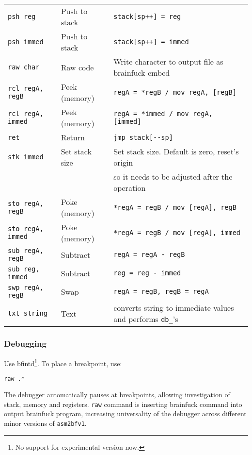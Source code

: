 \documentclass{article}
\begin{document}
\begin{table}[h]
\begin{longtable}{lll}
\verb|psh reg| & Push to stack & \verb|stack[sp++] = reg|     \\
\verb|psh immed| & Push to stack & \verb|stack[sp++] = immed|     \\
\verb|raw char| & Raw code & Write character to output file as brainfuck embed     \\
\verb|rcl regA, regB| & Peek (memory) & \verb|regA = *regB / mov regA, [regB]|      \\
\verb|rcl regA, immed| & Peek (memory) & \verb|regA = *immed / mov regA, [immed]|      \\
\verb|ret| & Return & \verb|jmp stack[--sp]|     \\
\verb|stk immed| & Set stack size & Set stack size. Default is zero, reset's origin       \\
 & & so it needs to be adjusted after the operation \\
\verb|sto regA, regB| & Poke (memory) & \verb|*regA = regB / mov [regA], regB|      \\
\verb|sto regA, immed| & Poke (memory) & \verb|*regA = regB / mov [regA], immed|      \\
\verb|sub regA, regB| & Subtract & \verb|regA = regA - regB|      \\
\verb|sub reg, immed| & Subtract & \verb|reg = reg - immed|      \\
\verb|swp regA, regB| & Swap & \verb|regA = regB, regB = regA|      \\
\verb|txt string| & Text & converts string to immediate values and performs \verb|db_|'s      \\

\end{longtable}
\end{table}

\restoregeometry

\newpage

\subsubsection{Debugging}
\par Use bfintd\footnote{No support for experimental version now.}. To place a breakpoint, use:

\begin{verbatim}
raw .*
\end{verbatim}

\par The debugger automatically pauses at breakpoints, allowing investigation of stack, memory and registers. \verb|raw| command is inserting brainfuck command into output brainfuck program, increasing universality of the debugger across different minor versions of \verb|asm2bfv1|.
\end{document}
